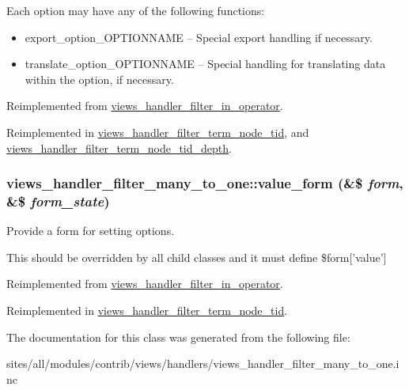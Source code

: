  Each option may have any of the following functions:\begin{itemize}
\item export\_\-option\_\-OPTIONNAME -- Special export handling if necessary.\item translate\_\-option\_\-OPTIONNAME -- Special handling for translating data within the option, if necessary. \end{itemize}


Reimplemented from \hyperlink{classviews__handler__filter__in__operator_76892fbc2f6206e88d83925e187c4ab7}{views\_\-handler\_\-filter\_\-in\_\-operator}.

Reimplemented in \hyperlink{classviews__handler__filter__term__node__tid_e81fb582295a2c8871b32bbf8b3ea915}{views\_\-handler\_\-filter\_\-term\_\-node\_\-tid}, and \hyperlink{classviews__handler__filter__term__node__tid__depth_e0822209bc155abaec93555bbeb93e78}{views\_\-handler\_\-filter\_\-term\_\-node\_\-tid\_\-depth}.\hypertarget{classviews__handler__filter__many__to__one_6c5e3bbabc2ed73418f835195c10f451}{
\subsubsection[{value\_\-form}]{\setlength{\rightskip}{0pt plus 5cm}views\_\-handler\_\-filter\_\-many\_\-to\_\-one::value\_\-form (\&\$ {\em form}, \/  \&\$ {\em form\_\-state})}}
\label{classviews__handler__filter__many__to__one_6c5e3bbabc2ed73418f835195c10f451}


Provide a form for setting options.

This should be overridden by all child classes and it must define \$form\mbox{[}'value'\mbox{]} 

Reimplemented from \hyperlink{classviews__handler__filter__in__operator_6736083657cad0f8c7299b000f2b8e60}{views\_\-handler\_\-filter\_\-in\_\-operator}.

Reimplemented in \hyperlink{classviews__handler__filter__term__node__tid_3259d8a91cb0c13c51c02942b267b131}{views\_\-handler\_\-filter\_\-term\_\-node\_\-tid}.

The documentation for this class was generated from the following file:\begin{CompactItemize}
\item 
sites/all/modules/contrib/views/handlers/views\_\-handler\_\-filter\_\-many\_\-to\_\-one.inc\end{CompactItemize}
